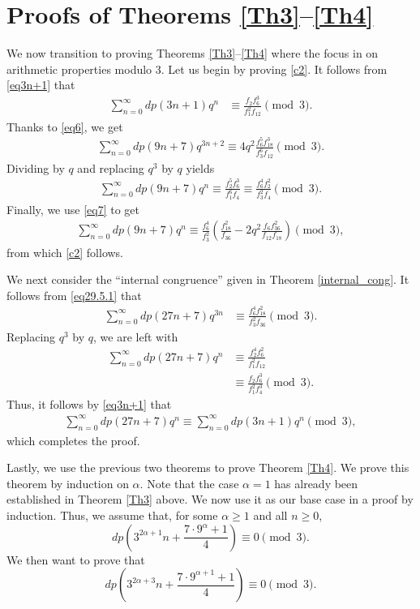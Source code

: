 \documentclass{amsart}
\begin{document}
\section{Proofs of Theorems \ref{Th3}--\ref{Th4}}
We now transition to proving Theorems \ref{Th3}--\ref{Th4} where the focus in on arithmetic properties modulo 3.  Let us begin by proving \eqref{c2}. It follows from \eqref{eq3n+1} that
\begin{align*}
\sum_{n=0}^{\infty} dp(3n+1)q^{n} & \equiv \frac{f_{2}f_{6}^3}{f_1^2f_{12}} \pmod{3}. 
\end{align*}
Thanks to \eqref{eq6}, we get
\begin{align*}
\sum_{n=0}^{\infty} dp(9n+7)q^{3n+2} \equiv 4q^2\frac{f_{6}^5f_{18}^3}{f_3^6f_{12}} \pmod{3}.
\end{align*}
Dividing by $q$ and replacing $q^3$ by $q$ yields 
\begin{align*}
\sum_{n=0}^{\infty} dp(9n+7)q^{n} \equiv \frac{f_{2}^5f_{6}^3}{f_1^6f_{4}} \equiv \frac{f_6^4f_2^2}{f_3^2f_4} \pmod{3}.
\end{align*}
Finally, we use \eqref{eq7} to get
\begin{align}
\sum_{n=0}^{\infty} dp(9n+7)q^{n} \equiv \frac{f_6^4}{f_3^2} \left( \frac{f_{18}^2}{f_{36}} - 2q^2\displaystyle\frac{f_{6}f_{36}^2}{f_{12}f_{18}} \right) \pmod{3},
\label{eq29.5.1}
\end{align}
from which \eqref{c2} follows.

We next consider the ``internal congruence'' given in Theorem \ref{internal_cong}.  It follows from \eqref{eq29.5.1} that
\begin{align*}
\sum_{n=0}^{\infty} dp(27n+7)q^{3n} & \equiv \frac{f_6^4f_{18}^2}{f_3^2f_{36}}  \pmod{3}.
\end{align*}
Replacing $q^3$ by $q$, we are left with
\begin{align*}
\sum_{n=0}^{\infty} dp(27n+7)q^{n} & \equiv \frac{f_2^4f_{6}^2}{f_1^2f_{12}} \\
& \equiv \frac{f_2f_{6}^3}{f_1^2f_{4}^3} \pmod{3}.
\end{align*}
Thus, it follows by \eqref{eq3n+1} that
\begin{align*}
\sum_{n=0}^{\infty} dp(27n+7)q^{n}  \equiv \sum_{n=0}^{\infty} dp(3n+1)q^{n} \pmod{3},
\end{align*}
which completes the proof.

Lastly, we use the previous two theorems to prove Theorem \ref{Th4}.
We prove this theorem by induction on $\alpha$.  Note that the case $\alpha=1$ has already been established in Theorem \ref{Th3} above.  We now use it as our base case in a proof by induction.   
Thus, we assume that, for some $\alpha\geq 1$ and all $n\geq 0$, 
$$
dp \left( 3^{2\alpha + 1}n + \frac{7 \cdot 9^\alpha + 1}{4} \right) \equiv 0 \pmod{3}.
$$
We then want to prove that 
$$
dp \left( 3^{2\alpha + 3}n + \frac{7 \cdot 9^{\alpha+1} + 1}{4} \right) \equiv 0 \pmod{3}.
$$
\end{document}
